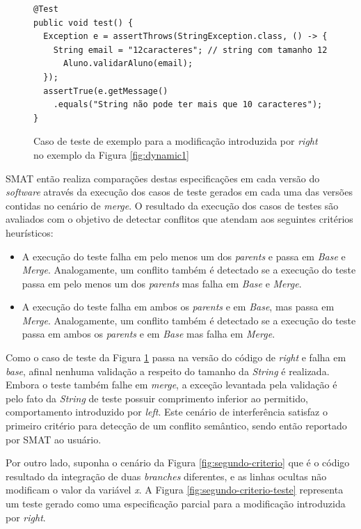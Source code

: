 \documentclass[12pt]{article}
\begin{document}
\begin{figure}[H]
\begin{verbatim}
@Test
public void test() {
  Exception e = assertThrows(StringException.class, () -> {
    String email = "12caracteres"; // string com tamanho 12
      Aluno.validarAluno(email);
  });
  assertTrue(e.getMessage()
    .equals("String não pode ter mais que 10 caracteres");
}
\end{verbatim}
\caption{Caso de teste de exemplo para a modificação introduzida por \textit{right} no exemplo da Figura \ref{fig:dynamic1}}
\label{fig:teste}
\end{figure}
SMAT então realiza comparações destas especificações em cada versão do  \textit{software} através da execução dos casos de teste gerados em cada uma das versões contidas no cenário de \textit{merge}. O resultado da execução dos casos de testes são avaliados com o objetivo de detectar conflitos que atendam aos seguintes critérios heurísticos:
\begin{itemize}
    \item A execução do teste falha em pelo menos um dos \textit{parents} e passa em \textit{Base} e \textit{Merge}. Analogamente, um conflito também é detectado se a execução do teste passa em pelo menos um dos \textit{parents} mas falha em \textit{Base} e \textit{Merge}.
    \item A execução do teste falha em ambos os \textit{parents} e em \textit{Base}, mas passa em \textit{Merge}. Analogamente, um conflito também é detectado se a execução do teste passa em ambos os \textit{parents} e em \textit{Base} mas falha em \textit{Merge}.
\end{itemize}
Como o caso de teste da Figura \ref{fig:teste} passa na versão do código de \textit{right} e falha em \textit{base}, afinal nenhuma validação a respeito do tamanho da \textit{String} é realizada. Embora o teste também falhe em \textit{merge}, a exceção levantada pela validação é pelo fato da \textit{String} de teste possuir comprimento inferior ao permitido, comportamento introduzido por \textit{left}. Este cenário de interferência satisfaz o primeiro critério para detecção de um conflito semântico, sendo então reportado por SMAT ao usuário.

Por outro lado, suponha o cenário da Figura \ref{fig:segundo-criterio} que é o código resultado da integração de duas \textit{branches} diferentes, e as linhas ocultas não modificam o valor da variável \textit{x}. A Figura \ref{fig:segundo-criterio-teste} representa um teste gerado como uma especificação parcial para a modificação introduzida por \textit{right}.
\end{document}
